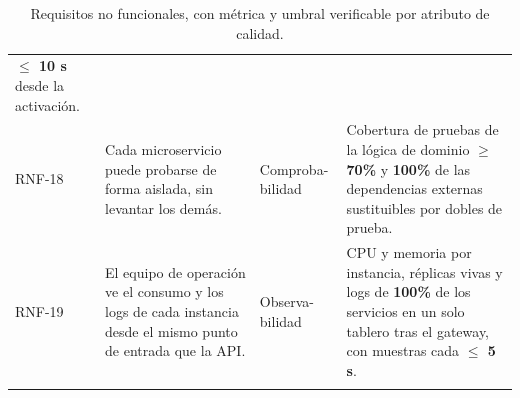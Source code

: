 \begin{center}
\begin{longtable}{p{1.3cm}p{5.2cm}p{2.4cm}p{5.4cm}}
\textbf{$\leq$ 10 s} desde la activación.\\[0.3em]
RNF-18 & Cada microservicio puede probarse de forma aislada, sin levantar los demás.
& Comproba-bilidad & Cobertura de pruebas de la lógica de dominio \textbf{$\geq$ 70\%} y
\textbf{100\%} de las dependencias externas sustituibles por dobles de prueba.\\[0.3em]
RNF-19 & El equipo de operación ve el consumo y los logs de cada instancia desde el mismo punto de
entrada que la API. & Observa-bilidad & CPU y memoria por instancia, réplicas vivas y logs de
\textbf{100\%} de los servicios en un solo tablero tras el gateway, con muestras cada
\textbf{$\leq$ 5 s}.\\
\bottomrule
\caption{Requisitos no funcionales, con métrica y umbral verificable por atributo de calidad.}
\label{tab:rnf}
\end{longtable}
\end{center}
